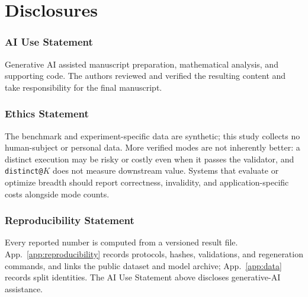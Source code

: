 \documentclass{article}
\newcommand{\1}{\mathbf 1}
\theoremstyle{remark}
\theoremstyle{definition}
\theoremstyle{plain}
\begin{document}
\section{Disclosures}
\label{app:disclosures}

\subsubsection*{AI Use Statement}
\label{sec:ai-use}

Generative AI assisted manuscript preparation, mathematical analysis, and
supporting code. The authors reviewed and verified the resulting content and
take responsibility for the final manuscript.

\subsubsection*{Ethics Statement}

The benchmark and experiment-specific data are synthetic; this study collects
no human-subject or personal data. More verified modes are not inherently
better: a distinct execution may be risky or costly even when it passes the
validator, and \texttt{distinct@}$K$ does not measure downstream value. Systems
that evaluate or optimize breadth should report correctness, invalidity, and
application-specific costs alongside mode counts.

\subsubsection*{Reproducibility Statement}

Every reported number is computed from a versioned result file.
App.~\ref{app:reproducibility} records protocols, hashes, validations,
and regeneration commands, and links the public dataset and model archive;
App.~\ref{app:data} records split identities.
The AI Use Statement above discloses generative-AI assistance.
\end{document}
